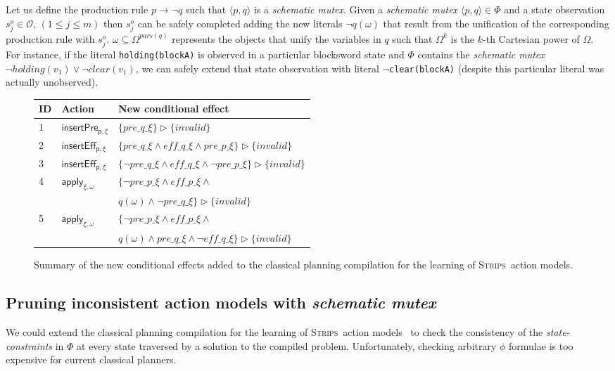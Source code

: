 \documentclass{article}
\newcommand{\tup}[1]{{\langle #1 \rangle}}
\newcommand{\strips}{\textsc{Strips}}
\begin{document}
Let us define the production rule $p\rightarrow\neg q$ such that $\tup{p,q}$ is a {\em schematic mutex}. Given a {\em schematic mutex} $\tup{p,q}\in \Phi$ and a state observation $s_j^o\in \mathcal{O}$, {\small $(1\leq j\leq m)$} then $s_j^o$ can be safely completed adding the new literals $\neg q(\omega)$ that result from the unification of the corresponding production rule with $s_j^o$. $\omega\subseteq\Omega^{pars(q)}$ represents the objects that unify the variables in $q$ such that $\Omega^k$ is the $k$-th Cartesian power of $\Omega$. For instance, if the literal {\tt\small holding(blockA)} is observed in a particular blocksword state and $\Phi$ contains the {\em schematic mutex} $\neg holding(v_1)\vee\neg clear(v_1)$, we can safely extend that state observation with literal {\tt\small $\neg$clear(blockA)} (despite this particular literal was actually unobserved).


\begin{figure}
\begin{footnotesize}
\begin{tabular}{lll}
{\bf ID} & {\bf Action} & {\bf New conditional effect}\\\hline
1&$\mathsf{insertPre_{p,\xi}}$&$\{pre\_q\_\xi\}\rhd\{invalid\}$\\
2&$\mathsf{insertEff_{p,\xi}}$&$\{pre\_q\_\xi\wedge eff\_q\_\xi\wedge pre\_p\_\xi\}\rhd\{invalid\}$\\
3&$\mathsf{insertEff_{p,\xi}}$&$\{\neg pre\_q\_\xi\wedge eff\_q\_\xi\wedge \neg pre\_p\_\xi\}\rhd\{invalid\}$\\
4&$\mathsf{apply_{\xi,\omega}}$&$\{\neg pre\_p\_\xi \wedge eff\_p\_\xi \wedge $\\
&&$q(\omega)\wedge \neg pre\_q\_\xi\}\rhd\{invalid\}$\\
5&$\mathsf{apply_{\xi,\omega}}$&$\{\neg pre\_p\_\xi \wedge eff\_p\_\xi \wedge $\\
&&$q(\omega)\wedge pre\_q\_\xi \wedge \neg eff\_q\_\xi\}\rhd\{invalid\}$
\end{tabular}
\end{footnotesize}
	\caption{\small Summary of the new conditional effects added to the classical planning compilation for the learning of \strips\ action models.}
	\label{fig:ceffects}
\end{figure}

\subsection{Pruning inconsistent action models with {\em schematic mutex}}
We could extend the classical planning compilation for the learning of \strips\ action models~\cite{aineto2018learning} to check the consistency of the {\em state-constraints} in $\Phi$ at every state traversed by a solution to the compiled problem. Unfortunately, checking arbitrary $\phi$ formulae is too expensive for current classical planners.
\end{document}
